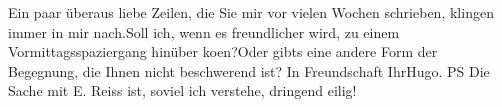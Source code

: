 \pstart
           Ein paar überaus liebe Zeilen, die Sie mir vor vielen Wochen schrieben, klingen immer
               in mir nach.\hspace*{1.5em}Soll ich, wenn es freundlicher wird, zu
               einem Vormittagsspaziergang hinüber ko{\geminationm}en?\hspace*{1.5em}Oder gibts eine andere Form der Begegnung, die Ihnen
               nicht beschwerend ist?\pend
           \pstart In Freundschaft Ihr\spacefill\mbox{Hugo.}\pend{}
\pstart
           \noindent{}PS Die Sache mit E. Reiss ist, soviel ich
                  verstehe, dringend eilig!\pend
           \endnumbering{}  \newcommand{\dateiname}{L02466}\newcommand{\titel}{Hugo Hofmannsthal an Arthur Schnitzler, 9. 3. [1926]}\newcommand{\editorInnen}{Martin Anton Müller und Gerd-Hermann Susen}
